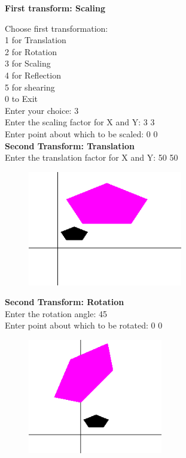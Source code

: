 \documentclass[9pt,letterpaper]{article}
\begin{document}
\newpage

\textbf{\Large{First transform: Scaling }}

Choose first transformation: \\
1 for Translation\\
2 for Rotation\\
3 for Scaling\\
4 for Reflection\\
5 for shearing\\
0 to Exit\\
Enter your choice: 3\\
Enter the scaling factor for X and Y: 3 3\\
Enter point about which to be scaled: 0 0\\


\textbf{\large{Second Transform: Translation}}\\
Enter the translation factor for X and Y: 50 50 \\

\begin{figure}[h]
    \centering
    \includegraphics[height=5cm]{CompositeTransformations/Outputs/ScaleTranslate.png}
\end{figure}

\newpage

\textbf{\large{Second Transform: Rotation}}\\
Enter the rotation angle: 45 \\
Enter point about which to be rotated: 0 0\\

\begin{figure}[h]
    \centering
    \includegraphics[height=5cm]{CompositeTransformations/Outputs/ScaleRotate.png}
\end{figure}
\end{document}
